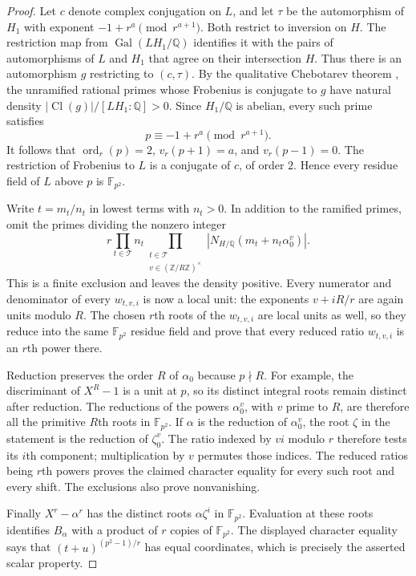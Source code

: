 \documentclass[11pt]{article}
\newcommand{\ord}{\operatorname{ord}}
\theoremstyle{definition}
\theoremstyle{remark}
\begin{document}
\begin{proof}
Let $c$ denote complex conjugation on $L$, and let $\tau$ be
the automorphism of $H_1$ with exponent
$-1+r^a\pmod{r^{a+1}}$.  Both restrict to inversion on $H$.
The restriction map from $\operatorname{Gal}(LH_1/\mathbb Q)$
identifies it with the pairs of automorphisms of $L$ and $H_1$
that agree on their intersection $H$.  Thus there is an
automorphism $g$ restricting to $(c,\tau)$.
By the qualitative Chebotarev theorem
\citep[Section~2.1, Theorem~1, p.~131]{Serre1981Chebotarev},
the unramified rational primes whose Frobenius is conjugate to
$g$ have natural density
$|\operatorname{Cl}(g)|/[LH_1:\mathbb Q]>0$.
Since $H_1/\mathbb Q$ is abelian, every such prime satisfies
\[
 p\equiv-1+r^a\pmod{r^{a+1}}.
\]
It follows that $\ord_r(p)=2$, $v_r(p+1)=a$, and
$v_r(p-1)=0$.  The restriction of Frobenius to $L$ is a
conjugate of $c$, of order $2$.  Hence every residue field of
$L$ above $p$ is $\mathbb F_{p^2}$.

Write $t=m_t/n_t$ in lowest terms with $n_t>0$.
In addition to the ramified primes, omit the primes dividing
the nonzero integer
\[
 r\prod_{t\in\mathcal T}n_t
  \prod_{\substack{t\in\mathcal T\\
                   v\in(\mathbb Z/R\mathbb Z)^\times}}
       \left|N_{H/\mathbb Q}(m_t+n_t\alpha_0^v)\right|.
\]
This is a finite exclusion and leaves the density positive.
Every numerator and denominator of every $w_{t,v,i}$ is now a
local unit: the exponents $v+iR/r$ are again units modulo $R$.
The chosen $r$th roots of the $w_{t,v,i}$ are local units as
well, so they reduce into the same $\mathbb F_{p^2}$ residue
field and prove that every reduced ratio $w_{t,v,i}$ is an
$r$th power there.

Reduction preserves the order $R$ of $\alpha_0$ because
$p\nmid R$.  For example, the discriminant of $X^R-1$ is a
unit at $p$, so its distinct integral roots remain distinct
after reduction.  The reductions of the powers $\alpha_0^v$,
with $v$ prime to $R$, are therefore all the primitive $R$th
roots in $\mathbb F_{p^2}$.  If $\alpha$ is the reduction of
$\alpha_0^v$, the root $\zeta$ in the statement is the reduction
of $\zeta_0^v$.  The ratio indexed by $vi$ modulo $r$ therefore
tests its $i$th component; multiplication by $v$ permutes those
indices.  The reduced ratios being $r$th powers proves the
claimed character equality for every such root and every shift.  The exclusions also prove nonvanishing.

Finally $X^r-\alpha^r$ has the distinct roots
$\alpha\zeta^i$ in $\mathbb F_{p^2}$.  Evaluation at these roots
identifies $B_\alpha$ with a product of $r$ copies of
$\mathbb F_{p^2}$.  The displayed character equality says that
$(t+u)^{(p^2-1)/r}$ has equal coordinates, which is precisely
the asserted scalar property.
\end{proof}
\end{document}
